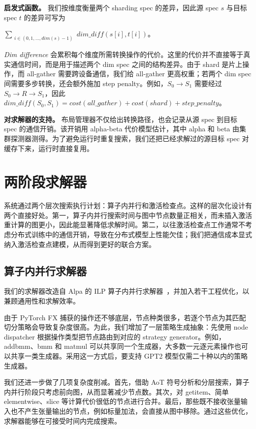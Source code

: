 \documentclass[10pt,letterpaper,twocolumn]{article}
\begin{document}
\noindent\textbf{启发式函数。} 我们按维度衡量两个 sharding spec 的差异，因此源 spec $s$ 与目标 spec $t$ 的差异可写为
\begin{center}
$\sum_{\substack{i \in (0, 1, \dotsc, dim(s)-1)}} dim\_diff(s[i], t[i])$。
\end{center}

\textit{Dim difference} 会累积每个维度所需转换操作的代价。这里的代价并不直接等于真实通信时间，而是用于描述两个 dim spec 之间的结构差异。由于 shard 是片上操作，而 all-gather 需要跨设备通信，我们给 all-gather 更高权重；若两个 dim spec 间需要多步转换，还会额外施加 step penalty。例如，$S_0 \rightarrow S_1$ 需要经过 $S_0 \rightarrow R \rightarrow S_1$，因此
$dim\_diff(S_0, S_1) = cost(all\_gather) + cost(shard) + step\_penalty$。

\noindent\textbf{对求解器的支持。} 布局管理器不仅给出转换路径，也会记录从源 spec 到目标 spec 的通信开销。该开销用 alpha-beta 代价模型估计，其中 alpha 和 beta 由集群探测器测得。为了避免运行时重复搜索，我们还把已经求解过的源目标 spec 对缓存下来，运行时直接复用。

\section{两阶段求解器}

系统通过两个层次搜索执行计划：算子内并行和激活检查点。这样的层次化设计有两个直接好处。第一，算子内并行搜索时间与图中节点数量正相关，而未插入激活重计算的图更小，因此能显著降低求解时间。第二，以往激活检查点工作通常不考虑分布式训练中的通信开销，导致在分布式模型上性能欠佳；我们把通信成本显式纳入激活检查点建模，从而得到更好的联合方案。

\subsection{算子内并行求解器}

我们的求解器改造自 Alpa 的 ILP 算子内并行求解器~\cite{zheng2022alpa}，并加入若干工程优化，以兼顾通用性和求解效率。

由于 PyTorch FX 捕获的操作还不够底层，节点种类很多，若逐个节点为其匹配切分策略会导致复杂度很高。为此，我们增加了一层策略生成抽象：先使用 node dispatcher 根据操作类型把节点路由到对应的 strategy generator。例如，addbmm、bmm 和 matmul 可以共享同一个生成器，大多数一元逐元素操作也可以共享一类生成器。采用这一方式后，要支持 GPT2 模型仅需二十种以内的策略生成器。

我们还进一步做了几项复杂度削减。首先，借助 AoT 符号分析和分层搜索，算子内并行阶段只考虑前向图，从而显著减少节点数。其次，对 getitem、简单 elementwise、slice 等计算代价很低的节点进行合并。最后，那些既不接收张量输入也不产生张量输出的节点，例如标量加法，会直接从图中移除。通过这些优化，求解器能够在可接受时间内完成搜索。
\end{document}
